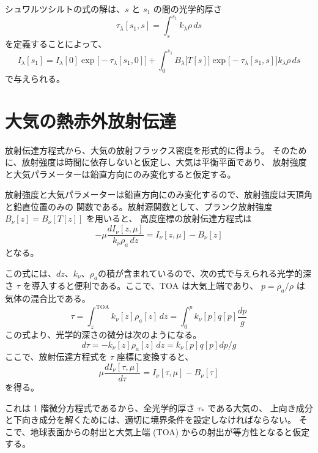 \documentclass[article]{dennou777}
\begin{document}
シュワルツシルトの式の解は、$s$ と $s_1$ の間の光学的厚さ
\begin{equation}
	\tau_\lambda[s_1,s]=\int^{s_1}_s k_\lambda\rho\,ds
\end{equation}
を定義することによって、
\begin{equation}
	I_\lambda[s_1]=I_\lambda[0]\exp\bigl[-\tau_\lambda[s_1,0]\bigr]+
	\int^{s_1}_{0}B_\lambda\bigl[T[s]\bigr]\exp\bigl[-\tau_\lambda[s_1,s]\bigr]k_\lambda\rho\,ds
\end{equation}
で与えられる。


\section{大気の熱赤外放射伝達}
放射伝達方程式から、大気の放射フラックス密度を形式的に得よう。
そのために、放射強度は時間に依存しないと仮定し、大気は平衡平面であり、
放射強度と大気パラメーターは鉛直方向にのみ変化すると仮定する。

放射強度と大気パラメーターは鉛直方向にのみ変化するので、放射強度は天頂角と鉛直位置のみの
関数である。放射源関数として、プランク放射強度 $B_\nu[z]=B_\nu[T[z]]$ を用いると、
高度座標の放射伝達方程式は
\begin{equation}
	-\mu\frac{dI_\nu[z,\mu]}{k_\nu\rho_a\,dz}=I_\nu[z,\mu]-B_\nu[z]
\end{equation}
となる。

この式には、$dz$、$k_\nu$、$\rho_a$の積が含まれているので、次の式で与えられる光学的深さ
$\tau$ を導入すると便利である。ここで、$\mathrm{TOA}$ は大気上端であり、
$p=\rho_a/\rho$ は気体の混合比である。
\begin{equation}
	\tau=\int^{\mathrm{TOA}}_{z} k_\nu[z]\rho_a[z]\,dz=\int^p_0 k_\nu[p]q[p]\frac{dp}{g}
\end{equation}
この式より、光学的深さの微分は次のようになる。
\begin{equation}
	d\tau=-k_\nu[z]\rho_a[z]\,dz=k_\nu[p]q[p]dp/g
\end{equation}
ここで、放射伝達方程式を $\tau$ 座標に変換すると、
\begin{equation}
	\mu\frac{dI_\nu[\tau,\mu]}{d\tau}=I_\nu[\tau,\mu]-B_\nu[\tau]
\end{equation}
を得る。

これは 1 階微分方程式であるから、全光学的厚さ $\tau_*$ である大気の、
上向き成分と下向き成分を解くためには、適切に境界条件を設定しなければならない。
そこで、地球表面からの射出と大気上端 (TOA) からの射出が等方性となると仮定する。
\end{document}
